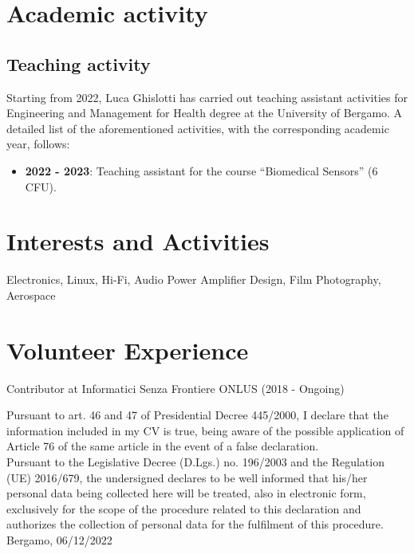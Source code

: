 \documentclass[11pt]{article}
\begin{document}
\bigskip
\section*{Academic activity}
\subsection*{Teaching activity}
Starting from 2022, Luca Ghislotti has carried out teaching assistant activities for Engineering and Management for Health degree at the University of Bergamo. A detailed list of the aforementioned activities, with the corresponding academic year, follows:\\

\vspace{-0.5em}
\begin{itemize}
	\item \textbf{2022 - 2023}: Teaching assistant for the course “Biomedical Sensors” (6 CFU).
\end{itemize}


\bigskip
\section*{Interests and Activities}
Electronics, Linux, Hi-Fi,  Audio Power Amplifier Design, Film Photography, Aerospace

\bigskip
\section*{Volunteer Experience}
Contributor at Informatici Senza Frontiere ONLUS (2018 - Ongoing)

\vspace{1cm}
\noindent
Pursuant to art. 46 and 47 of Presidential Decree 445/2000, I declare that the information included in my CV is true, being aware of the possible application of Article 76 of the same article in the event of a false declaration.\\
Pursuant to the Legislative Decree (D.Lgs.) no. 196/2003 and the Regulation (UE) 2016/679, the undersigned declares to be well informed that his/her personal data being collected here will be treated, also in electronic form, exclusively for the scope of the procedure related to this declaration and authorizes the collection of personal data for the fulfilment of this procedure.\\

\bigskip
Bergamo, 06/12/2022
\vspace{1cm}
\end{document}

